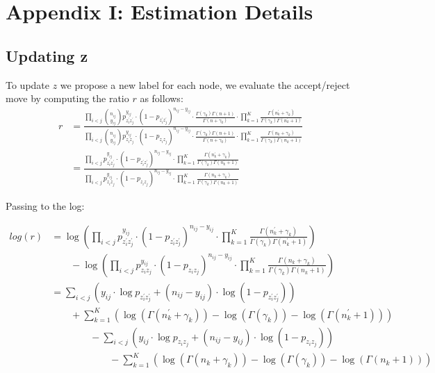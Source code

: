 \documentclass[11pt]{amsart}
\begin{document}
\clearpage

\section{Appendix I: Estimation Details}


\subsection{Updating z}

To update $z$ we propose a new label for each node, we evaluate the accept/reject move by computing the ratio $r$ as follows:
\begin{align}
r &= \frac{\prod_{i<j}\binom{n_{ij}}{y_{ij}}p_{z^{\prime}_i z^{\prime}_j}^{y_{ij}} \cdot (1 - p_{z^{\prime}_i z^{\prime}_j})^{n_{ij} - y_{ij}} \cdot \frac{\Gamma(\gamma_0) \Gamma(n+1)}{\Gamma(n + \gamma_0)} \cdot \prod_{k=1}^K \frac{\Gamma(n^{\prime}_k + \gamma_k)}{\Gamma(\gamma_k)  \Gamma(n^{\prime}_k + 1)}}{\prod_{i<j}\binom{n_{ij}}{y_{ij}}p_{z_iz_j}^{y_{ij}} \cdot (1 - p_{z_iz_j})^{n_{ij} - y_{ij}}\cdot \frac{\Gamma(\gamma_0) \Gamma(n+1)}{\Gamma(n + \gamma_0)} \cdot \prod_{k=1}^K \frac{\Gamma(n_k + \gamma_k)}{\Gamma(\gamma_k)  \Gamma(n_k + 1)}} \\
 &= \frac{\prod_{i<j}p_{z^{\prime}_i z^{\prime}_j}^{y_{ij}} \cdot (1 - p_{z^{\prime}_i z^{\prime}_j})^{n_{ij} - y_{ij}} \cdot  \prod_{k=1}^K \frac{\Gamma(n^{\prime}_k + \gamma_k)}{\Gamma(\gamma_k)  \Gamma(n^{\prime}_k + 1)}}{\prod_{i<j}p_{z_iz_j}^{y_{ij}} \cdot (1 - p_{z_iz_j})^{n_{ij} - y_{ij}} \cdot \prod_{k=1}^K \frac{\Gamma(n_k + \gamma_k)}{\Gamma(\gamma_k)  \Gamma(n_k + 1)}} 
\end{align}


Passing to the log:

\begin{align}
log(r) &= \log{ \left( \prod_{i<j}p_{z^{\prime}_i z^{\prime}_j}^{y_{ij}} \cdot (1 - p_{z^{\prime}_i z^{\prime}_j})^{n_{ij} - y_{ij}} \cdot  \prod_{k=1}^K \frac{\Gamma(n^{\prime}_k + \gamma_k)}{\Gamma(\gamma_k)  \Gamma(n^{\prime}_k + 1)} \right) }  \nonumber \\
& \qquad - \log{ \left( \prod_{i<j}p_{z_iz_j}^{y_{ij}} \cdot (1 - p_{z_iz_j})^{n_{ij} - y_{ij}} \cdot \prod_{k=1}^K \frac{\Gamma(n_k + \gamma_k)}{\Gamma(\gamma_k)  \Gamma(n_k + 1)}\right)} \nonumber \\
&= \sum_{i<j} \left(   y_{ij} \cdot \log{ p_{z^{\prime}_i z^{\prime}_j} } + (n_{ij} - y_{ij}) \cdot \log{ (1 - p_{z^{\prime}_i z^{\prime}_j}) } \right)\nonumber \\ 
&\qquad +  \sum_{k=1}^K\left(\log\left(\Gamma(n^{\prime}_{k}+\gamma_{k})\right) - \log\left(\Gamma(\gamma_{k})\right) - \log\left(\Gamma\left(n^{\prime}_{k}+1\right)\right) \right)  \nonumber  \\
& \qquad \qquad - \sum_{i<j} \left(  y_{ij} \cdot \log{ p_{z_i z_j} } + (n_{ij} - y_{ij}) \cdot \log{ (1 - p_{z_i z_j}) } \right) \nonumber \\
&\qquad \qquad \qquad - \sum_{k=1}^K\left(\log\left(\Gamma(n_{k}+\gamma_{k})\right) - \log\left(\Gamma(\gamma_{k})\right) - \log\left(\Gamma\left(n_{k}+1\right)\right) \right) \nonumber \\
\end{align}
\end{document}
